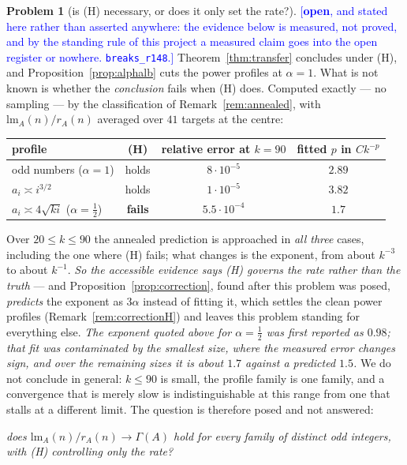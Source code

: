 \documentclass[11pt,a4paper]{article}
\theoremstyle{plain}
\theoremstyle{definition}
\newtheorem{problem}[theorem]{Problem}
\theoremstyle{remark}
\newcommand{\STATUS}[1]{\textcolor{blue}{\textsf{[#1]}}}
\begin{document}
\begin{problem}[is \textup{(H)} necessary, or does it only set the rate?]\label{prob:hrate}
\STATUS{\textbf{open}, and stated here rather than asserted anywhere: the evidence below is
measured, not proved, and by the standing rule of this project a measured claim goes into the
open register or nowhere. \texttt{breaks\_r148}.}
Theorem~\ref{thm:transfer} concludes under \textup{(H)}, and
Proposition~\ref{prop:alphalb} cuts the power profiles at $\alpha=1$. What is not known is
whether the \emph{conclusion} fails when \textup{(H)} does. Computed exactly --- no sampling ---
by the classification of Remark~\ref{rem:annealed}, with $\mathrm{lm}_A(n)/r_A(n)$ averaged over
$41$ targets at the centre:
\begin{center}
\begin{tabular}{lccc}
\toprule
profile & \textup{(H)} & relative error at $k=90$ & fitted $p$ in $C k^{-p}$\\
\midrule
odd numbers ($\alpha=1$)        & holds & $8\cdot10^{-5}$ & $2.89$\\
$a_i\asymp i^{3/2}$             & holds & $1\cdot10^{-5}$ & $3.82$\\
$a_i\asymp 4\sqrt{ki}$ ($\alpha=\tfrac12$) & \textbf{fails} & $5.5\cdot10^{-4}$ & $\mathbf{1.7}$\\
\bottomrule
\end{tabular}
\end{center}
\noindent
Over $20\le k\le90$ the annealed prediction is approached in \emph{all three} cases, including
the one where \textup{(H)} fails; what changes is the exponent, from about $k^{-3}$ to about
$k^{-1}$. \emph{So the accessible evidence says \textup{(H)} governs the rate rather than the
truth} --- and Proposition~\ref{prop:correction}, found after this problem was posed,
\emph{predicts} the exponent as $3\alpha$ instead of fitting it, which settles the clean power
profiles (Remark~\ref{rem:correctionH}) and leaves this problem standing for everything else.
\emph{The exponent quoted above for $\alpha=\tfrac12$ was first reported as $0.98$; that fit was
contaminated by the smallest size, where the measured error changes sign, and over the remaining
sizes it is about $1.7$ against a predicted $1.5$.} We do not conclude in general: $k\le90$ is small, the profile family is one family, and a
convergence that is merely slow is indistinguishable at this range from one that stalls at a
different limit. The question is therefore posed and not answered:

\begin{center}
\emph{does $\mathrm{lm}_A(n)/r_A(n)\to\Gamma(A)$ hold for every family of distinct odd integers,
with \textup{(H)} controlling only the rate?}
\end{center}


\end{problem}
\end{document}
